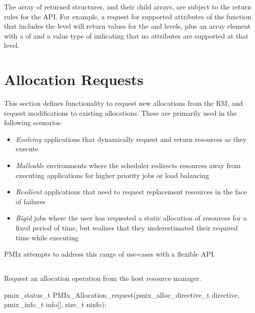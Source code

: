 The array of returned structures, and their child arrays, are subject to the return rules for the  \ac{API}. For example, a request for supported attributes of the  function that includes the  level will return values for the  and  levels, plus an array element with a  of  and a value type of  indicating that no attributes are supported at that level.

\section{Allocation Requests}
\label{chap:api_job_mgmt:alloc}

This section defines functionality to request new allocations from the \ac{RM}, and request modifications to existing allocations.
These are primarily used in the following scenarios:
\begin{itemize}
\item \textit{Evolving} applications that dynamically request and return resources as they execute
\item \textit{Malleable} environments where the scheduler redirects resources away from executing applications for higher priority jobs or load balancing
\item \textit{Resilient} applications that need to request replacement resources in the face of failures
\item \textit{Rigid} jobs where the user has requested a static allocation of resources for a fixed period of time, but realizes that they underestimated their required time while executing
\end{itemize}
\ac{PMIx} attempts to address this range of use-cases with a flexible \ac{API}.

\subsection{}

\summary

Request an allocation operation from the host resource manager.

\format

\cspecificstart
\begin{codepar}
pmix_status_t
PMIx_Allocation_request(pmix_alloc_directive_t directive,
                        pmix_info_t info[], size_t ninfo);
\end{codepar}
\cspecificend

